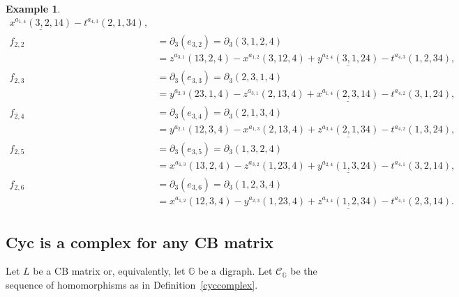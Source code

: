 \documentclass[10pt]{amsart}
\newcommand{\mbg}{\mbox{$\mathbb{G}$}}
\newcommand{\mcc}{\mbox{$\mathcal{C}$}}
\newcommand{\cb}{\mbox{$\mathrm{CB}$}}
\newcommand{\dif}{\mbox{$\partial$}}
\newtheorem{example}[cdrthm]{Example}
\theoremstyle{definition}
\theoremstyle{remark}
\begin{document}
\begin{example}
\begin{align*}
\underline{x^{a_{1,4}}(3,2,14)}-t^{a_{4,3}}(2,1,34),\\
f_{2,2}&= \dif_3(e_{3,2})=
\dif_3(3,1,2,4) \\&= z^{a_{3,1}}(13,2,4)-x^{a_{1,2}}(3,12,4)+
\underline{y^{a_{2,4}}(3,1,24)}-t^{a_{4,3}}(1,2,34),\\
f_{2,3}&=  \dif_3(e_{3,3})=
\dif_3(2,3,1,4)\\ &= y^{a_{2,3}}(23,1,4)-z^{a_{3,1}}(2,13,4)+
\underline{x^{a_{1,4}}(2,3,14)}-t^{a_{4,2}}(3,1,24),\\
f_{2,4}&= \dif_3(e_{3,4})=
\dif_3(2,1,3,4)\\ &= y^{a_{2,1}}(12,3,4)-x^{a_{1,3}}(2,13,4)
+\underline{z^{a_{3,4}}(2,1,34)}-t^{a_{4,2}}(1,3,24),\\
f_{2,5}&=\dif_3(e_{3,5})=
\dif_3(1,3,2,4)\\ &= x^{a_{1,3}}(13,2,4)-z^{a_{3,2}}(1,23,4)+
\underline{y^{a_{2,4}}(1,3,24)}-t^{a_{4,1}}(3,2,14),\\
f_{2,6}&= \dif_3(e_{3,6})= 
\dif_3(1,2,3,4)\\ &= x^{a_{1,2}}(12,3,4)-y^{a_{2,3}}(1,23,4)+
\underline{z^{a_{3,4}}(1,2,34)}-t^{a_{4,1}}(2,3,14).
\end{align*}
\end{example}

\subsection{Cyc is a complex for any CB matrix}\label{cyc-complex-cb}

 Let $L$ be a $\cb$ matrix or, equivalently, let $\mbg$ be a
digraph. Let $\mcc_{\mathbb{G}}$ be the sequence of homomorphisms as
in Definition~\ref{cyccomplex}.
\end{document}
